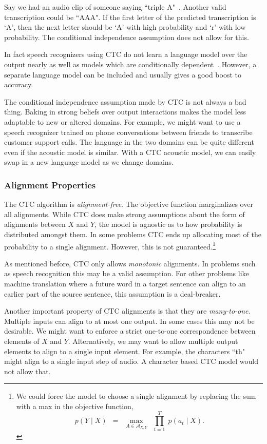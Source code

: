Say we had an audio clip of someone saying ``triple A"~\cite{chan2016}. Another
valid transcription could be ``AAA". If the first letter of the predicted
transcription is `A', then the next letter should be `A' with high probability
and `r' with low probability. The conditional independence assumption does not
allow for this.

In fact speech recognizers using CTC do not learn a language model over the
output nearly as well as models which are conditionally
dependent~\cite{battenberg2017}. However, a separate language model can be
included and usually gives a good boost to accuracy.

The conditional independence assumption made by CTC is not always a bad thing.
Baking in strong beliefs over output interactions makes the model less
adaptable to new or altered domains. For example, we might want to use a speech
recognizer trained on phone conversations between friends to transcribe
customer support calls. The language in the two domains can be quite different
even if the acoustic model is similar. With a CTC acoustic model, we can easily
swap in a new language model as we change domains.

\subsubsection{Alignment Properties}

The CTC algorithm is {\it alignment-free}. The objective function marginalizes
over all alignments. While CTC does make strong assumptions about the form of
alignments between $X$ and $Y$, the model is agnostic as to how probability is
distributed amongst them. In some problems CTC ends up allocating most of the
probability to a single alignment. However, this is not guaranteed.\footnote{We
could force the model to choose a single alignment by replacing the sum with a
max in the objective function,
\[
p(Y \mid X) \enspace = \enspace \max_{A \in \mathcal{A}_{X,Y}} \enspace \prod_{t=1}^T \; p(a_t \mid X).
\]
}

As mentioned before, CTC only allows {\it monotonic} alignments. In problems
such as speech recognition this may be a valid assumption. For other problems
like machine translation where a future word in a target sentence can align to
an earlier part of the source sentence, this assumption is a deal-breaker.

Another important property of CTC alignments is that they are {\it
many-to-one}. Multiple inputs can align to at most one output. In some cases
this may not be desirable. We might want to enforce a strict one-to-one
correspondence between elements of $X$ and $Y$. Alternatively, we may want to
allow multiple output elements to align to a single input element. For example,
the characters ``th" might align to a single input step of audio. A character
based CTC model would not allow that.

